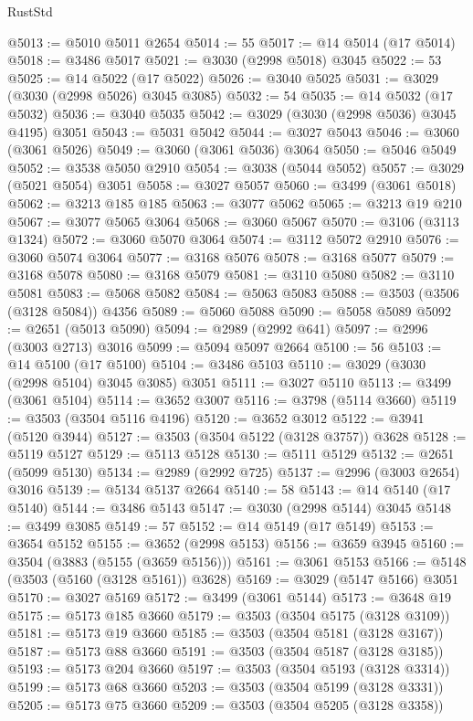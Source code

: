 \begin{lexlean}{RustStd}
\begin{coremodule}
@5013 := @5010 @5011 @2654
@5014 := 55
@5017 := @14 @5014 (@17 @5014)
@5018 := @3486 @5017
@5021 := @3030 (@2998 @5018) @3045
@5022 := 53
@5025 := @14 @5022 (@17 @5022)
@5026 := @3040 @5025
@5031 := @3029 (@3030 (@2998 @5026) @3045 @3085)
@5032 := 54
@5035 := @14 @5032 (@17 @5032)
@5036 := @3040 @5035
@5042 := @3029 (@3030 (@2998 @5036) @3045 @4195) @3051
@5043 := @5031 @5042
@5044 := @3027 @5043
@5046 := @3060 (@3061 @5026)
@5049 := @3060 (@3061 @5036) @3064
@5050 := @5046 @5049
@5052 := @3538 @5050 @2910
@5054 := @3038 (@5044 @5052)
@5057 := @3029 (@5021 @5054) @3051
@5058 := @3027 @5057
@5060 := @3499 (@3061 @5018)
@5062 := @3213 @185 @185
@5063 := @3077 @5062
@5065 := @3213 @19 @210
@5067 := @3077 @5065 @3064
@5068 := @3060 @5067
@5070 := @3106 (@3113 @1324)
@5072 := @3060 @5070 @3064
@5074 := @3112 @5072 @2910
@5076 := @3060 @5074 @3064
@5077 := @3168 @5076
@5078 := @3168 @5077
@5079 := @3168 @5078
@5080 := @3168 @5079
@5081 := @3110 @5080
@5082 := @3110 @5081
@5083 := @5068 @5082
@5084 := @5063 @5083
@5088 := @3503 (@3506 (@3128 @5084)) @4356
@5089 := @5060 @5088
@5090 := @5058 @5089
@5092 := @2651 (@5013 @5090)
@5094 := @2989 (@2992 @641)
@5097 := @2996 (@3003 @2713) @3016
@5099 := @5094 @5097 @2664
@5100 := 56
@5103 := @14 @5100 (@17 @5100)
@5104 := @3486 @5103
@5110 := @3029 (@3030 (@2998 @5104) @3045 @3085) @3051
@5111 := @3027 @5110
@5113 := @3499 (@3061 @5104)
@5114 := @3652 @3007
@5116 := @3798 (@5114 @3660)
@5119 := @3503 (@3504 @5116 @4196)
@5120 := @3652 @3012
@5122 := @3941 (@5120 @3944)
@5127 := @3503 (@3504 @5122 (@3128 @3757)) @3628
@5128 := @5119 @5127
@5129 := @5113 @5128
@5130 := @5111 @5129
@5132 := @2651 (@5099 @5130)
@5134 := @2989 (@2992 @725)
@5137 := @2996 (@3003 @2654) @3016
@5139 := @5134 @5137 @2664
@5140 := 58
@5143 := @14 @5140 (@17 @5140)
@5144 := @3486 @5143
@5147 := @3030 (@2998 @5144) @3045
@5148 := @3499 @3085
@5149 := 57
@5152 := @14 @5149 (@17 @5149)
@5153 := @3654 @5152
@5155 := @3652 (@2998 @5153)
@5156 := @3659 @3945
@5160 := @3504 (@3883 (@5155 (@3659 @5156)))
@5161 := @3061 @5153
@5166 := @5148 (@3503 (@5160 (@3128 @5161)) @3628)
@5169 := @3029 (@5147 @5166) @3051
@5170 := @3027 @5169
@5172 := @3499 (@3061 @5144)
@5173 := @3648 @19
@5175 := @5173 @185 @3660
@5179 := @3503 (@3504 @5175 (@3128 @3109))
@5181 := @5173 @19 @3660
@5185 := @3503 (@3504 @5181 (@3128 @3167))
@5187 := @5173 @88 @3660
@5191 := @3503 (@3504 @5187 (@3128 @3185))
@5193 := @5173 @204 @3660
@5197 := @3503 (@3504 @5193 (@3128 @3314))
@5199 := @5173 @68 @3660
@5203 := @3503 (@3504 @5199 (@3128 @3331))
@5205 := @5173 @75 @3660
@5209 := @3503 (@3504 @5205 (@3128 @3358))

\end{coremodule}
\end{lexlean}
